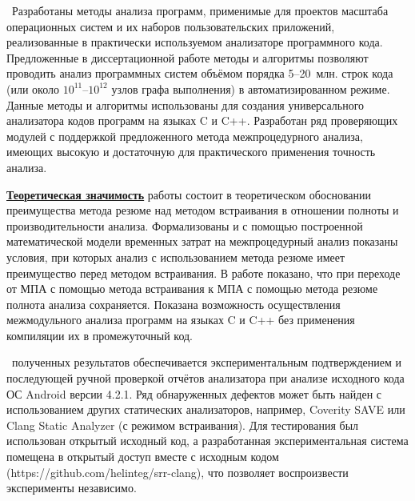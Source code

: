 \influence\ Разработаны методы анализа программ, применимые для проектов масштаба операционных систем и их наборов пользовательских приложений, реализованные в практически используемом анализаторе программного кода. Предложенные в диссертационной работе методы и алгоритмы позволяют проводить анализ программных систем объёмом порядка 5--20~млн. строк кода (или около $10^{11}$--$10^{12}$ узлов графа выполнения) в автоматизированном режиме. Данные методы и алгоритмы использованы для создания универсального анализатора кодов программ на языках C и C++. Разработан ряд проверяющих модулей с поддержкой предложенного метода межпроцедурного анализа, имеющих высокую и достаточную для практического применения точность анализа.

\underline{\textbf{Теоретическая значимость}} работы состоит в теоретическом обосновании преимущества метода резюме над методом встраивания в отношении полноты и производительности анализа. Формализованы и с помощью построенной математической модели временных затрат на межпроцедурный анализ показаны условия, при которых анализ с использованием метода резюме имеет преимущество перед методом встраивания. В работе показано, что при переходе от МПА с помощью метода встраивания к МПА с помощью метода резюме полнота анализа сохраняется. Показана возможность осуществления межмодульного анализа программ на языках C и C++ без применения компиляции их в промежуточный код.

\reliability\ полученных результатов обеспечивается экспериментальным подтверждением и последующей ручной проверкой отчётов анализатора при анализе исходного кода ОС Android версии 4.2.1. Ряд обнаруженных дефектов может быть найден с использованием других статических анализаторов, например, Coverity SAVE или Clang Static Analyzer (с режимом встраивания). Для тестирования был использован открытый исходный код, а разработанная экспериментальная система помещена в открытый доступ вместе с исходным кодом (https://github.com/helinteg/srr-clang), что позволяет воспроизвести эксперименты независимо.

